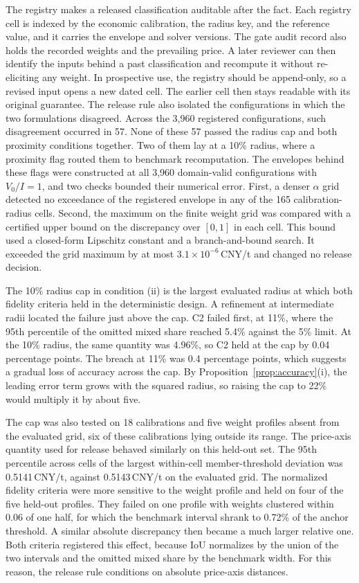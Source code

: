 The registry makes a released classification auditable after the fact. Each registry cell is indexed by the economic calibration, the radius key, and the reference value, and it carries the envelope and solver versions. The gate audit record also holds the recorded weights and the prevailing price. A later reviewer can then identify the inputs behind a past classification and recompute it without re-eliciting any weight. In prospective use, the registry should be append-only, so a revised input opens a new dated cell. The earlier cell then stays readable with its original guarantee. The release rule also isolated the configurations in which the two formulations disagreed. Across the 3,960 registered configurations, such disagreement occurred in 57. None of these 57 passed the radius cap and both proximity conditions together. Two of them lay at a 10\% radius, where a proximity flag routed them to benchmark recomputation. The envelopes behind these flags were constructed at all 3,960 domain-valid configurations with $V_0/I=1$, and two checks bounded their numerical error. First, a denser $\alpha$ grid detected no exceedance of the registered envelope in any of the 165 calibration-radius cells. Second, the maximum on the finite weight grid was compared with a certified upper bound on the discrepancy over $[0,1]$ in each cell. This bound used a closed-form Lipschitz constant and a branch-and-bound search. It exceeded the grid maximum by at most $3.1\times10^{-6}$\,CNY/t and changed no release decision.

The 10\% radius cap in condition (ii) is the largest evaluated radius at which both fidelity criteria held in the deterministic design. A refinement at intermediate radii located the failure just above the cap. C2 failed first, at 11\%, where the 95th percentile of the omitted mixed share reached 5.4\% against the 5\% limit. At the 10\% radius, the same quantity was 4.96\%, so C2 held at the cap by 0.04 percentage points. The breach at 11\% was 0.4 percentage points, which suggests a gradual loss of accuracy across the cap. By Proposition~\ref{prop:accuracy}(i), the leading error term grows with the squared radius, so raising the cap to 22\% would multiply it by about five.

The cap was also tested on 18 calibrations and five weight profiles absent from the evaluated grid, six of these calibrations lying outside its range. The price-axis quantity used for release behaved similarly on this held-out set. The 95th percentile across cells of the largest within-cell member-threshold deviation was 0.5141\,CNY/t, against 0.5143\,CNY/t on the evaluated grid. The normalized fidelity criteria were more sensitive to the weight profile and held on four of the five held-out profiles. They failed on one profile with weights clustered within 0.06 of one half, for which the benchmark interval shrank to 0.72\% of the anchor threshold. A similar absolute discrepancy then became a much larger relative one. Both criteria registered this effect, because IoU normalizes by the union of the two intervals and the omitted mixed share by the benchmark width. For this reason, the release rule conditions on absolute price-axis distances.

